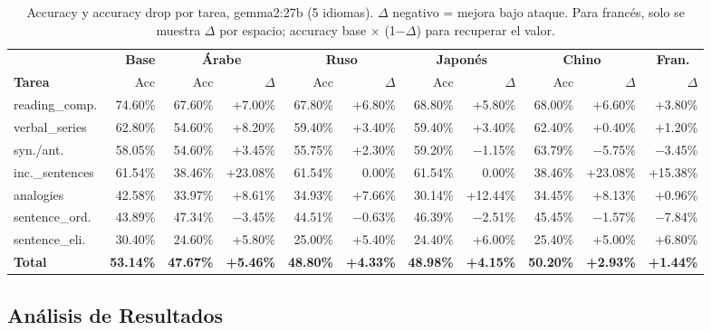 \documentclass[11pt]{article}
\begin{document}
\begin{table}[t]
  \centering\small
  \begin{tabular}{lrrrrrrrrrr}
    \toprule
    & \textbf{Base} &
    \multicolumn{2}{c}{\textbf{Árabe}} &
    \multicolumn{2}{c}{\textbf{Ruso}} &
    \multicolumn{2}{c}{\textbf{Japonés}} &
    \multicolumn{2}{c}{\textbf{Chino}} &
    \multicolumn{1}{c}{\textbf{Fran.}} \\
    \textbf{Tarea} & Acc & Acc & $\Delta$ & Acc & $\Delta$ & Acc & $\Delta$ & Acc & $\Delta$ & $\Delta$ \\
    \midrule
    reading\_comp.   & 74.60\% & 67.60\% & +7.00\% & 67.80\% & +6.80\% & 68.80\% & +5.80\% & 68.00\% & +6.60\% & +3.80\% \\
    verbal\_series   & 62.80\% & 54.60\% & +8.20\% & 59.40\% & +3.40\% & 59.40\% & +3.40\% & 62.40\% & +0.40\% & +1.20\% \\
    syn./ant.        & 58.05\% & 54.60\% & +3.45\% & 55.75\% & +2.30\% & 59.20\% & $-$1.15\% & 63.79\% & $-$5.75\% & $-$3.45\% \\
    inc.\_sentences  & 61.54\% & 38.46\% & +23.08\% & 61.54\% & \phantom{+}0.00\% & 61.54\% & \phantom{+}0.00\% & 38.46\% & +23.08\% & +15.38\% \\
    analogies        & 42.58\% & 33.97\% & +8.61\% & 34.93\% & +7.66\% & 30.14\% & +12.44\% & 34.45\% & +8.13\% & +0.96\% \\
    sentence\_ord.   & 43.89\% & 47.34\% & $-$3.45\% & 44.51\% & $-$0.63\% & 46.39\% & $-$2.51\% & 45.45\% & $-$1.57\% & $-$7.84\% \\
    sentence\_eli.   & 30.40\% & 24.60\% & +5.80\% & 25.00\% & +5.40\% & 24.40\% & +6.00\% & 25.40\% & +5.00\% & +6.80\% \\
    \midrule
    \textbf{Total}   & \textbf{53.14\%} & \textbf{47.67\%} & \textbf{+5.46\%} & \textbf{48.80\%} & \textbf{+4.33\%} & \textbf{48.98\%} & \textbf{+4.15\%} & \textbf{50.20\%} & \textbf{+2.93\%} & \textbf{+1.44\%} \\
    \bottomrule
  \end{tabular}
  \caption{Accuracy y accuracy drop por tarea, gemma2:27b (5 idiomas).
  $\Delta$ negativo = mejora bajo ataque. Para francés, solo se muestra
  $\Delta$ por espacio; accuracy base $\times$ (1$-\Delta$) para
  recuperar el valor.}
  \label{tab:gemma_pertask}
\end{table}
 
\subsection{Análisis de Resultados}
\label{sec:analisis}
\end{document}
